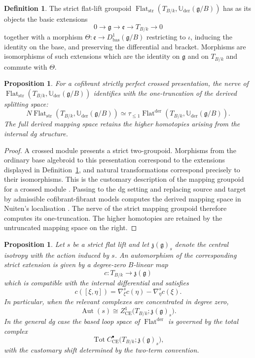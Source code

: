 \documentclass[11pt,reqno,a4paper,dvipsnames,x11names]{amsart}
\numberwithin{equation}{section}
\theoremstyle{plain}
\newtheorem{proposition}[theorem]{Proposition}
\theoremstyle{definition}
\newtheorem{definition}[theorem]{Definition}
\theoremstyle{remark}
\DeclareMathOperator{\Tot}{Tot}
\newcommand{\kk}{k}
\newcommand{\g}{\mathfrak g}
\newcommand{\e}{\mathfrak e}
\newcommand{\z}{\mathfrak z}
\newcommand{\Uder}{\mathbb U_{\mathrm{der}}}
\newcommand{\bas}{\mathrm{bas}}
\newcommand{\from}{\colon}
\begin{document}
\begin{definition}\label{def:strict-lift-groupoid}
The strict flat-lift groupoid
\(\operatorname{Flat}_{\mathrm{str}}(T_{B/\kk},\Uder(\g/B))\)
has as its objects the basic extensions
\[
 0\longrightarrow\g\longrightarrow\e\longrightarrow T_{B/\kk}\longrightarrow0
\]
together with a morphism
\(\Theta\from\e\to D^1_{\bas}(\g/B)\) restricting to \(\iota\), inducing the identity on the base, and preserving the differential and bracket. Morphisms are isomorphisms of such extensions which are the identity on \(\g\) and on \(T_{B/\kk}\) and commute with \(\Theta\).
\end{definition}

\begin{proposition}\label{prop:strict-presentation-crossed}
For a cofibrant strictly perfect crossed presentation, the nerve of
\(\operatorname{Flat}_{\mathrm{str}}(T_{B/\kk},\Uder(\g/B))\)
identifies with the one-truncation of the derived splitting space:
\[
 N\operatorname{Flat}_{\mathrm{str}}(T_{B/\kk},\Uder(\g/B))
 \simeq
 \tau_{\leq1}
 \operatorname{Flat}^{\mathrm{der}}(T_{B/\kk},\Uder(\g/B)).
\]
The full derived mapping space retains the higher homotopies arising from the internal dg structure.
\end{proposition}

\begin{proof}
A crossed module presents a strict two-groupoid. Morphisms from the ordinary base algebroid to this presentation correspond to the extensions displayed in Definition~\ref{def:strict-lift-groupoid}, and natural transformations correspond precisely to their isomorphisms. This is the customary description of the mapping groupoid for a crossed module \cite{BrownSpencer76,Noohi07}. Passing to the dg setting and replacing source and target by admissible cofibrant-fibrant models computes the derived mapping space in Nuiten's localisation \cite{Nuiten}. The nerve of the strict mapping groupoid therefore computes its one-truncation. The higher homotopies are retained by the untruncated mapping space on the right.
\end{proof}

\begin{proposition}\label{prop:central-stabiliser-complex}
Let \(s\) be a strict flat lift and let \(\z(\g)_s\) denote the central isotropy with the action induced by \(s\). An automorphism of the corresponding strict extension is given by a degree-zero \(B\)-linear map
\[
 c\from T_{B/\kk}\longrightarrow\z(\g)
\]
which is compatible with the internal differential and satisfies
\[
 c([\xi,\eta])
 =\nabla^s_\xi c(\eta)-\nabla^s_\eta c(\xi).
\]
In particular, when the relevant complexes are concentrated in degree zero,
\[
 \operatorname{Aut}(s)
 \cong
 Z^1_{\mathrm{CE}}
 \bigl(T_{B/\kk};\z(\g)_s\bigr).
\]
In the general dg case the based loop space of
\(\operatorname{Flat}^{\mathrm{der}}\) is governed by the total complex
\[
 \Tot C^\bullet_{\mathrm{CE}}
 \bigl(T_{B/\kk};\z(\g)_s\bigr),
\]
with the customary shift determined by the two-term convention.
\end{proposition}
\end{document}
